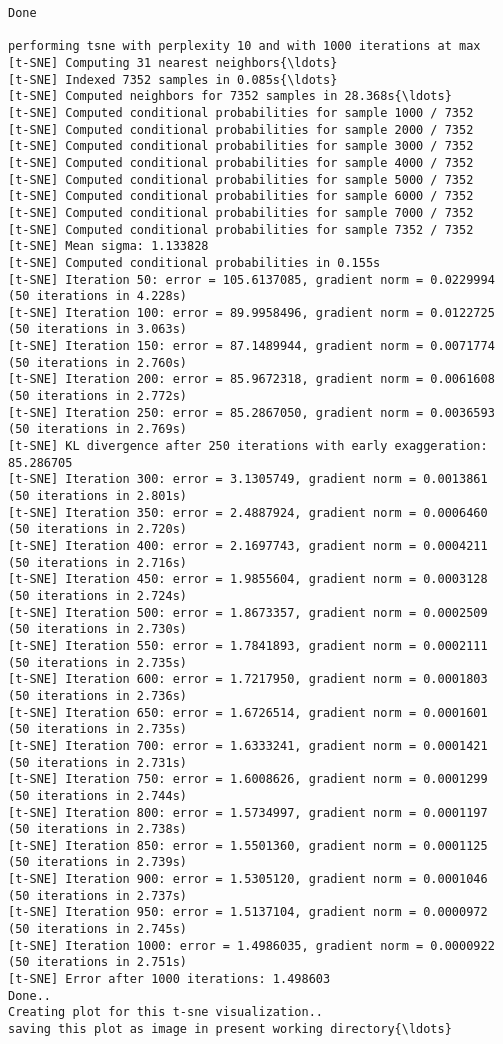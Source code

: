 \documentclass[11pt]{article}
\begin{document}
    \begin{Verbatim}[commandchars=\\\{\}]
Done

performing tsne with perplexity 10 and with 1000 iterations at max
[t-SNE] Computing 31 nearest neighbors{\ldots}
[t-SNE] Indexed 7352 samples in 0.085s{\ldots}
[t-SNE] Computed neighbors for 7352 samples in 28.368s{\ldots}
[t-SNE] Computed conditional probabilities for sample 1000 / 7352
[t-SNE] Computed conditional probabilities for sample 2000 / 7352
[t-SNE] Computed conditional probabilities for sample 3000 / 7352
[t-SNE] Computed conditional probabilities for sample 4000 / 7352
[t-SNE] Computed conditional probabilities for sample 5000 / 7352
[t-SNE] Computed conditional probabilities for sample 6000 / 7352
[t-SNE] Computed conditional probabilities for sample 7000 / 7352
[t-SNE] Computed conditional probabilities for sample 7352 / 7352
[t-SNE] Mean sigma: 1.133828
[t-SNE] Computed conditional probabilities in 0.155s
[t-SNE] Iteration 50: error = 105.6137085, gradient norm = 0.0229994 (50 iterations in 4.228s)
[t-SNE] Iteration 100: error = 89.9958496, gradient norm = 0.0122725 (50 iterations in 3.063s)
[t-SNE] Iteration 150: error = 87.1489944, gradient norm = 0.0071774 (50 iterations in 2.760s)
[t-SNE] Iteration 200: error = 85.9672318, gradient norm = 0.0061608 (50 iterations in 2.772s)
[t-SNE] Iteration 250: error = 85.2867050, gradient norm = 0.0036593 (50 iterations in 2.769s)
[t-SNE] KL divergence after 250 iterations with early exaggeration: 85.286705
[t-SNE] Iteration 300: error = 3.1305749, gradient norm = 0.0013861 (50 iterations in 2.801s)
[t-SNE] Iteration 350: error = 2.4887924, gradient norm = 0.0006460 (50 iterations in 2.720s)
[t-SNE] Iteration 400: error = 2.1697743, gradient norm = 0.0004211 (50 iterations in 2.716s)
[t-SNE] Iteration 450: error = 1.9855604, gradient norm = 0.0003128 (50 iterations in 2.724s)
[t-SNE] Iteration 500: error = 1.8673357, gradient norm = 0.0002509 (50 iterations in 2.730s)
[t-SNE] Iteration 550: error = 1.7841893, gradient norm = 0.0002111 (50 iterations in 2.735s)
[t-SNE] Iteration 600: error = 1.7217950, gradient norm = 0.0001803 (50 iterations in 2.736s)
[t-SNE] Iteration 650: error = 1.6726514, gradient norm = 0.0001601 (50 iterations in 2.735s)
[t-SNE] Iteration 700: error = 1.6333241, gradient norm = 0.0001421 (50 iterations in 2.731s)
[t-SNE] Iteration 750: error = 1.6008626, gradient norm = 0.0001299 (50 iterations in 2.744s)
[t-SNE] Iteration 800: error = 1.5734997, gradient norm = 0.0001197 (50 iterations in 2.738s)
[t-SNE] Iteration 850: error = 1.5501360, gradient norm = 0.0001125 (50 iterations in 2.739s)
[t-SNE] Iteration 900: error = 1.5305120, gradient norm = 0.0001046 (50 iterations in 2.737s)
[t-SNE] Iteration 950: error = 1.5137104, gradient norm = 0.0000972 (50 iterations in 2.745s)
[t-SNE] Iteration 1000: error = 1.4986035, gradient norm = 0.0000922 (50 iterations in 2.751s)
[t-SNE] Error after 1000 iterations: 1.498603
Done..
Creating plot for this t-sne visualization..
saving this plot as image in present working directory{\ldots}

    \end{Verbatim}
\end{document}
